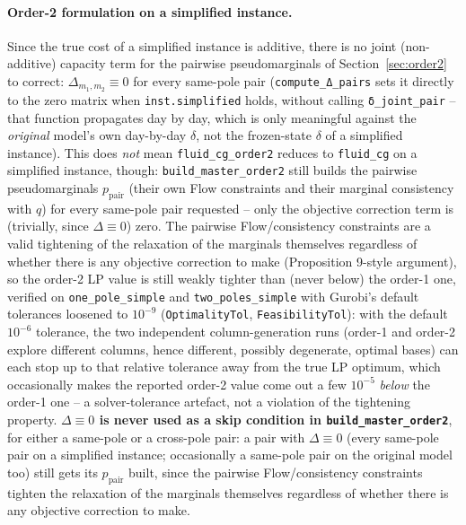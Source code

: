 \documentclass[11pt]{article}
\begin{document}
\paragraph{Order-2 formulation on a simplified instance.} Since the true cost of a
simplified instance is additive, there is no joint (non-additive) capacity term for the
pairwise pseudomarginals of Section~\ref{sec:order2} to correct: $\Delta_{m_1,m_2} \equiv 0$
for every same-pole pair (\texttt{compute\_Δ\_pairs} sets it directly to the zero matrix
when \texttt{inst.simplified} holds, without calling \texttt{δ\_joint\_pair} -- that
function propagates day by day, which is only meaningful against the \emph{original}
model's own day-by-day $\delta$, not the frozen-state $\delta$ of a simplified instance).
This does \emph{not} mean \texttt{fluid\_cg\_order2} reduces to \texttt{fluid\_cg} on a
simplified instance, though: \texttt{build\_master\_order2} still builds the pairwise
pseudomarginals $p_{\mathrm{pair}}$ (their own Flow constraints and their marginal
consistency with $q$) for every same-pole pair requested -- only the objective correction
term is (trivially, since $\Delta \equiv 0$) zero. The pairwise Flow/consistency
constraints are a valid tightening of the relaxation of the marginals themselves
regardless of whether there is any objective correction to make (Proposition 9-style
argument), so the order-2 LP value is still weakly tighter than (never below) the order-1
one, verified on \texttt{one\_pole\_simple} and \texttt{two\_poles\_simple} with Gurobi's
default tolerances loosened to $10^{-9}$ (\texttt{OptimalityTol}, \texttt{FeasibilityTol}):
with the default $10^{-6}$ tolerance, the two independent column-generation runs (order-1
and order-2 explore different columns, hence different, possibly degenerate, optimal
bases) can each stop up to that relative tolerance away from the true LP optimum, which
occasionally makes the reported order-2 value come out a few $10^{-5}$ \emph{below} the
order-1 one -- a solver-tolerance artefact, not a violation of the tightening property.
\textbf{$\Delta \equiv 0$ is never used as a skip condition in \texttt{build\_master\_order2}},
for either a same-pole or a cross-pole pair: a pair with $\Delta \equiv 0$ (every same-pole
pair on a simplified instance; occasionally a same-pole pair on the original model too)
still gets its $p_{\mathrm{pair}}$ built, since the pairwise Flow/consistency constraints
tighten the relaxation of the marginals themselves regardless of whether there is any
objective correction to make.
\end{document}
